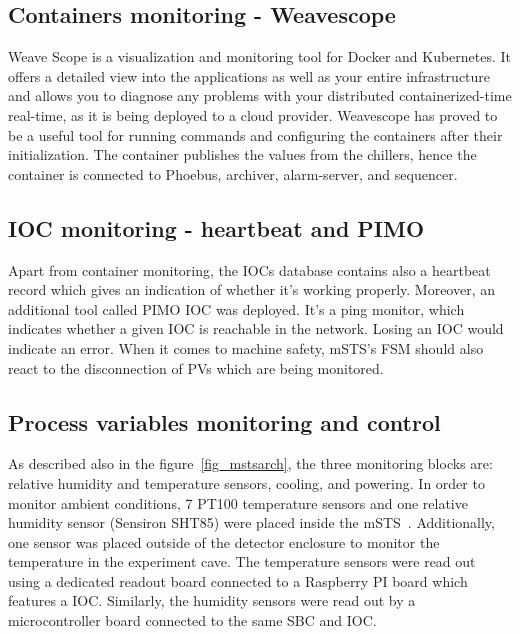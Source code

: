\newpage
\subsection{Containers monitoring - Weavescope}

Weave Scope is a visualization and monitoring tool for Docker and Kubernetes. It offers a detailed view into the applications as well as your entire infrastructure and allows you to diagnose any problems with your distributed containerized-time real-time, as it is being deployed to a cloud provider. Weavescope has proved to be a useful tool for running commands and configuring the containers after their initialization. The container publishes the values from the chillers, hence the container is connected to Phoebus, archiver, alarm-server, and sequencer. 
\subsection{IOC monitoring - heartbeat and PIMO}
Apart from container monitoring, the \glspl{IOC} database contains also a heartbeat record which gives an indication of whether it's working properly. Moreover, an additional tool called PIMO \gls{IOC} was deployed. It's a ping monitor, which indicates whether a given \gls{IOC} is reachable in the network. Losing an \gls{IOC} would indicate an error. When it comes to machine safety, \gls{mSTS}'s \gls{FSM} should also react to the disconnection of PVs which are being monitored.
\subsection{Process variables monitoring and control}
As described also in the figure~\ref{fig_mstsarch}, the three monitoring blocks are: relative humidity and temperature sensors, cooling, and powering. In  order to monitor ambient conditions, 7 PT100 temperature sensors and one relative humidity sensor (Sensiron SHT85) were placed inside the \gls{mSTS}~\cite{SHT85}. Additionally, one sensor was placed outside of the detector enclosure to monitor the temperature in the experiment cave. The temperature sensors were read out using a dedicated readout board connected to a Raspberry PI board which features a \gls{IOC}. Similarly, the humidity sensors were read out by a microcontroller board connected to the same \gls{SBC} and \gls{IOC}.


